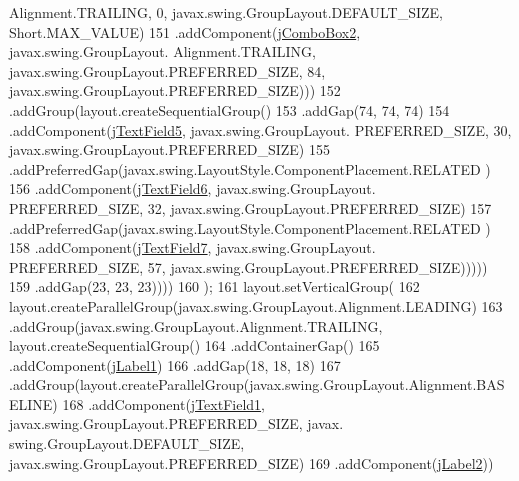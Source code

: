 \begin{DoxyCode}
      Alignment.TRAILING, 0, javax.swing.GroupLayout.DEFAULT\_SIZE, Short.MAX\_VALUE)
151                                             .addComponent(\mbox{\hyperlink{class_interfaz_package_1_1_alta_libro_texto_a49e7ef058be95fcf124448e008bec61f}{jComboBox2}}, javax.swing.GroupLayout.
      Alignment.TRAILING, javax.swing.GroupLayout.PREFERRED\_SIZE, 84, javax.swing.GroupLayout.PREFERRED\_SIZE)))
152                                     .addGroup(layout.createSequentialGroup()
153                                         .addGap(74, 74, 74)
154                                         .addComponent(\mbox{\hyperlink{class_interfaz_package_1_1_alta_libro_texto_ae2fee696ae7cc02fa1e6d395e6f55052}{jTextField5}}, javax.swing.GroupLayout.
      PREFERRED\_SIZE, 30, javax.swing.GroupLayout.PREFERRED\_SIZE)
155                                         .addPreferredGap(javax.swing.LayoutStyle.ComponentPlacement.RELATED
      )
156                                         .addComponent(\mbox{\hyperlink{class_interfaz_package_1_1_alta_libro_texto_a4f5e17cbbb06d3f1876983c80d2587a9}{jTextField6}}, javax.swing.GroupLayout.
      PREFERRED\_SIZE, 32, javax.swing.GroupLayout.PREFERRED\_SIZE)
157                                         .addPreferredGap(javax.swing.LayoutStyle.ComponentPlacement.RELATED
      )
158                                         .addComponent(\mbox{\hyperlink{class_interfaz_package_1_1_alta_libro_texto_af62a5b21c777c6bcb18074f1aeaed986}{jTextField7}}, javax.swing.GroupLayout.
      PREFERRED\_SIZE, 57, javax.swing.GroupLayout.PREFERRED\_SIZE)))))
159                         .addGap(23, 23, 23))))
160         );
161         layout.setVerticalGroup(
162             layout.createParallelGroup(javax.swing.GroupLayout.Alignment.LEADING)
163             .addGroup(javax.swing.GroupLayout.Alignment.TRAILING, layout.createSequentialGroup()
164                 .addContainerGap()
165                 .addComponent(\mbox{\hyperlink{class_interfaz_package_1_1_alta_libro_texto_a9cd5322905fec64c6411d5c05d635d3c}{jLabel1}})
166                 .addGap(18, 18, 18)
167                 .addGroup(layout.createParallelGroup(javax.swing.GroupLayout.Alignment.BASELINE)
168                     .addComponent(\mbox{\hyperlink{class_interfaz_package_1_1_alta_libro_texto_ad2e5ab6c5fe3388ffe5a1856c21c3bf0}{jTextField1}}, javax.swing.GroupLayout.PREFERRED\_SIZE, javax.
      swing.GroupLayout.DEFAULT\_SIZE, javax.swing.GroupLayout.PREFERRED\_SIZE)
169                     .addComponent(\mbox{\hyperlink{class_interfaz_package_1_1_alta_libro_texto_a627fbe8c20773d8c99f935168bdee2a2}{jLabel2}}))

\end{DoxyCode}
